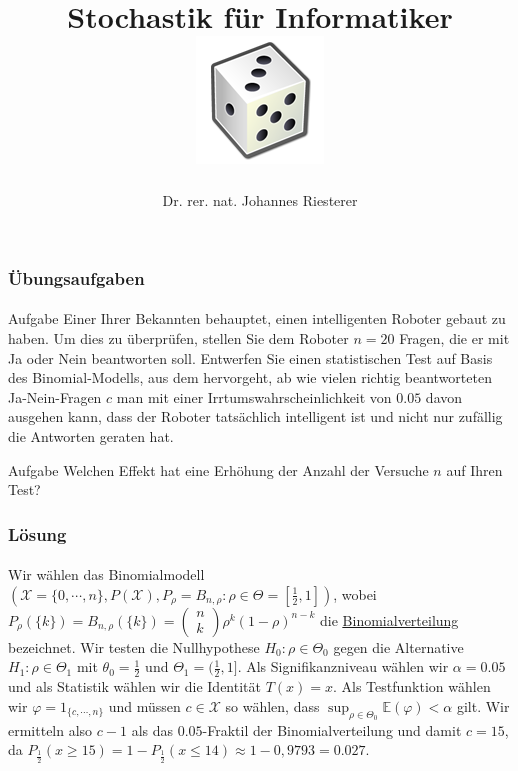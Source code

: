 \documentclass{beamer}
\begin{document}
\title[Stochastik] %
{Stochastik für Informatiker
\\
\includegraphics[scale=0.5]{img/craps}
}
\subtitle{}
\author[Dr. Johannes Riesterer] %
{Dr. rer. nat. Johannes Riesterer}

\date[KPT 2004] %
{}

\subject{Stochastik}

\frame{\titlepage}

\begin{frame}
    \frametitle{Übungsaufgaben}
\framesubtitle{}
\begin{block}{Aufgabe}
Einer Ihrer Bekannten behauptet, einen intelligenten Roboter gebaut zu haben. Um dies zu überprüfen, stellen Sie dem Roboter $n=20$ Fragen, die er mit Ja oder Nein beantworten soll. Entwerfen Sie einen  statistischen Test auf Basis des Binomial-Modells,  aus dem hervorgeht, ab wie vielen richtig beantworteten Ja-Nein-Fragen $c$ man mit einer Irrtumswahrscheinlichkeit von $0.05$ davon ausgehen kann, dass der Roboter tatsächlich intelligent ist und nicht nur zufällig die Antworten geraten hat. 
\end{block}
\begin{block}{Aufgabe}
Welchen Effekt hat eine Erhöhung der Anzahl der Versuche $n$ auf Ihren Test?
\end{block}
 \end{frame}


\begin{frame}
    \frametitle{Lösung}
\framesubtitle{}
Wir wählen das Binomialmodell $(\mathcal{X}= \{ 0, \cdots, n\},  P(\mathcal{X}), P_\rho = B_{n, \rho} : \rho \in \Theta =  [\frac{1}{2}, 1] )$, wobei $P_\rho (\{k \})=  B_{n, \rho}(\{k\}) = \begin{pmatrix} n \\ k \end{pmatrix} \rho^k (1-\rho)^{n-k} $ die \href{https://de.wikipedia.org/wiki/Binomialverteilung}{\underline{Binomialverteilung}} bezeichnet. Wir testen die Nullhypothese $H_0: \rho \in \Theta_0$ gegen die Alternative $H_1: \rho \in \Theta_1$ mit $\theta_0 = \frac{1}{2}$ und $\Theta_1 = (\frac{1}{2}, 1]$. Als Signifikanzniveau wählen wir $\alpha = 0.05$ und als Statistik wählen wir die Identität $T(x) = x$. Als Testfunktion wählen wir $\varphi = 1_{ \{ c, \cdots, n \}}$ und müssen $c \in \mathcal{X}$ so wählen, dass $\sup_{\rho \in \Theta_0} \mathbb{E}(\varphi )  < \alpha$ gilt.  Wir ermitteln also $c-1$ als das $0.05$-Fraktil der Binomialverteilung und damit $c = 15$, da $P_{\frac{1}{2}} (x \geq15) = 1 -P_{\frac{1}{2}} (x \leq 14) \approx 1 - 0,9793 = 0.027$.

 \end{frame}
\end{document}
